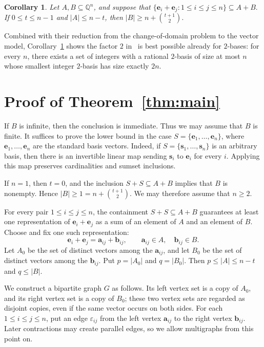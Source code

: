 \documentclass[11pt]{article}
\newtheorem{cor}[theorem]{Corollary}
\theoremstyle{definition}
\begin{document}
\begin{cor}\label{cor:BHK}
Let \(A,B\subseteq \mathbb{Q}^{n}\), and suppose that
\(
    \{\boldsymbol{e}_i+\boldsymbol{e}_j:1\le i\le j\le n\}\subseteq A+B.
\)
If \(0\le t\le n-1\) and \(|A|\le n-t\), then
\(
    |B|\ge n+\binom{t+1}{2}.
\)
\end{cor}
Combined with their reduction from the change-of-domain problem to the vector model, Corollary~\ref{cor:BHK} shows the factor \(2\) in~\cite[Theorem~1]{2025ATCAarith} is best possible already for \(2\)-bases: for every \(n\), there exists a set of integers with a rational \(2\)-basis of size at most \(n\) whose smallest integer \(2\)-basis has size exactly \(2n\).


\section{Proof of Theorem~\ref{thm:main}}
If \(B\) is infinite, then the conclusion is immediate. Thus we may assume that \(B\) is finite. It suffices to prove the lower bound in the case \(S=\{\boldsymbol{e}_1,\dots,\boldsymbol{e}_n\}\), where \(\boldsymbol{e}_1,\dots,\boldsymbol{e}_n\) are the standard basis vectors. Indeed, if \(S=\{\boldsymbol{s}_1,\dots,\boldsymbol{s}_n\}\) is an arbitrary basis, then there is an invertible linear map sending \(\boldsymbol{s}_i\) to \(\boldsymbol{e}_i\) for every \(i\). Applying this map preserves cardinalities and sumset inclusions.

If \(n=1\), then \(t=0\), and the inclusion \(S+S\subseteq A+B\) implies that \(B\) is nonempty. Hence \(|B|\ge 1=n+\binom{t+1}{2}\). We may therefore assume that \(n\ge 2\).

For every pair \(1\le i\le j\le n\), the containment \(S+S\subseteq A+B\) guarantees at least one representation of \(\boldsymbol{e}_i+\boldsymbol{e}_j\) as a sum of an element of \(A\) and an element of \(B\). Choose and fix one such representation:
\[
\boldsymbol{e}_i+\boldsymbol{e}_j=\boldsymbol{a}_{ij}+\boldsymbol{b}_{ij},\qquad
    \boldsymbol{a}_{ij}\in A,\quad \boldsymbol{b}_{ij}\in B.
\]
Let \(A_0\) be the set of distinct vectors among the \(\boldsymbol{a}_{ij}\), and let \(B_0\) be the set of distinct vectors among the \(\boldsymbol{b}_{ij}\). Put
\(
    p=|A_0|\) and \(q=|B_0|.\)
Then
\(
    p\le |A|\le n-t\) and \(q\le |B|.
\)

We construct a bipartite graph \(G\) as follows. Its left vertex set is a copy of \(A_0\), and its right vertex set is a copy of \(B_0\); these two vertex sets are regarded as disjoint copies, even if the same vector occurs on both sides. For each \(1\le i\le j\le n\), put an edge \(\varepsilon_{ij}\) from the left vertex \(\boldsymbol{a}_{ij}\) to the right vertex \(\boldsymbol{b}_{ij}\). Later contractions may create parallel edges, so we allow multigraphs from this point on.
\end{document}
